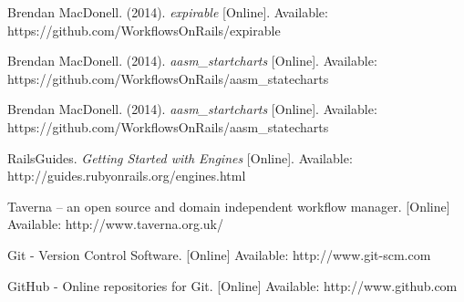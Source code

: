 \begin{thebibliography}{99}
Brendan MacDonell. (2014). \textit{expirable} [Online]. Available: https://github.com/WorkflowsOnRails/expirable

Brendan MacDonell. (2014). \textit{aasm\_startcharts} [Online]. Available: https://github.com/WorkflowsOnRails/aasm\_statecharts

Brendan MacDonell. (2014). \textit{aasm\_startcharts} [Online]. Available: https://github.com/WorkflowsOnRails/aasm\_statecharts

RailsGuides. \textit{Getting Started with Engines} [Online]. Available: http://guides.rubyonrails.org/engines.html

Taverna -- an open source and domain independent workflow manager. [Online] Available: http://www.taverna.org.uk/

Git - Version Control Software. [Online] Available: http://www.git-scm.com

GitHub - Online repositories for Git. [Online] Available: http://www.github.com

\end{thebibliography}

%    
%    

